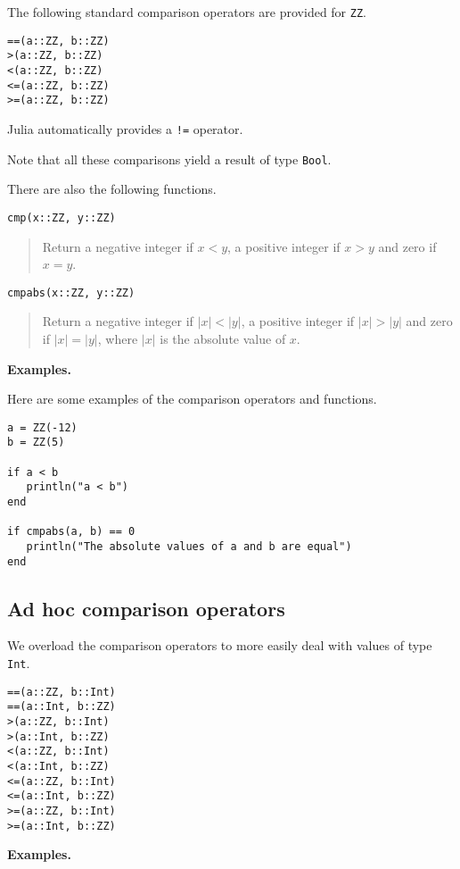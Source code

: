 \documentclass[a4paper,10pt]{article}
\newcommand{\code}{\lstinline}
\newcommand{\desc}[1]{\vspace{-3mm}\begin{quote}#1\end{quote}}
\begin{document}
{{{{{{The following standard comparison operators are provided for \code{ZZ}.

\begin{lstlisting}
==(a::ZZ, b::ZZ)
>(a::ZZ, b::ZZ)
<(a::ZZ, b::ZZ)
<=(a::ZZ, b::ZZ)
>=(a::ZZ, b::ZZ)
\end{lstlisting}

Julia automatically provides a \code{!=} operator.

Note that all these comparisons yield a result of type \code{Bool}.

There are also the following functions.

\begin{lstlisting}
cmp(x::ZZ, y::ZZ)
\end{lstlisting}

\desc{Return a negative integer if $x < y$, a positive integer if $x > y$ and zero if $x = y$.}

\begin{lstlisting}
cmpabs(x::ZZ, y::ZZ)
\end{lstlisting}

\desc{Return a negative integer if $|x| < |y|$, a positive integer if $|x| > |y|$ and zero if 
$|x| = |y|$, where $|x|$ is the absolute value of $x$.}

\textbf{Examples.}

Here are some examples of the comparison operators and functions.

\begin{lstlisting}
a = ZZ(-12)
b = ZZ(5)

if a < b
   println("a < b")
end

if cmpabs(a, b) == 0
   println("The absolute values of a and b are equal")
end
\end{lstlisting}

\subsection{Ad hoc comparison operators}

We overload the comparison operators to more easily deal with values of type \code{Int}.

\begin{lstlisting}
==(a::ZZ, b::Int)
==(a::Int, b::ZZ)
>(a::ZZ, b::Int)
>(a::Int, b::ZZ)
<(a::ZZ, b::Int)
<(a::Int, b::ZZ)
<=(a::ZZ, b::Int)
<=(a::Int, b::ZZ)
>=(a::ZZ, b::Int)
>=(a::Int, b::ZZ)
\end{lstlisting}

\textbf{Examples.}

}}}}}}
\end{document}
